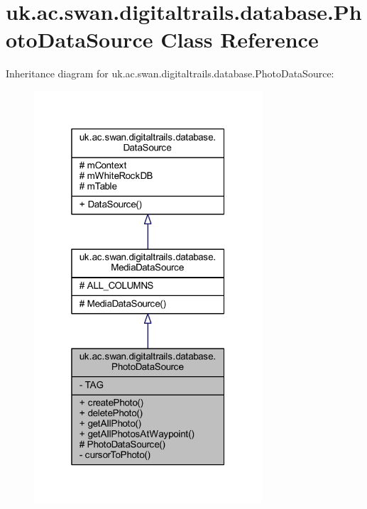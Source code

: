 \hypertarget{classuk_1_1ac_1_1swan_1_1digitaltrails_1_1database_1_1_photo_data_source}{\section{uk.\+ac.\+swan.\+digitaltrails.\+database.\+Photo\+Data\+Source Class Reference}
\label{classuk_1_1ac_1_1swan_1_1digitaltrails_1_1database_1_1_photo_data_source}
}


Inheritance diagram for uk.\+ac.\+swan.\+digitaltrails.\+database.\+Photo\+Data\+Source\+:
\nopagebreak
\begin{figure}[H]
\begin{center}
\leavevmode
\includegraphics[width=241pt]{classuk_1_1ac_1_1swan_1_1digitaltrails_1_1database_1_1_photo_data_source__inherit__graph}
\end{center}
\end{figure}


